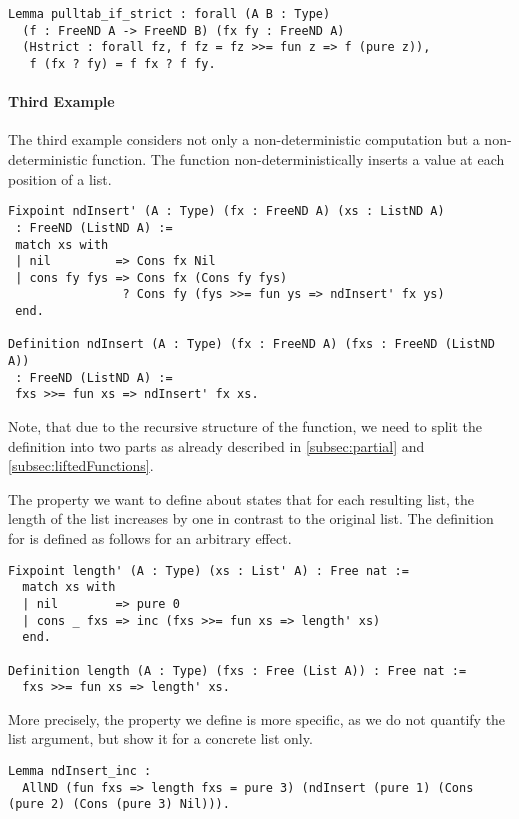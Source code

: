 \begin{verbatim}
Lemma pulltab_if_strict : forall (A B : Type)
  (f : FreeND A -> FreeND B) (fx fy : FreeND A)
  (Hstrict : forall fz, f fz = fz >>= fun z => f (pure z)),
   f (fx ? fy) = f fx ? f fy.
\end{verbatim}

\paragraph{Third Example}
The third example considers not only a non-deterministic computation but a non-deterministic function.
The function  non-deterministically inserts a value at each position of a list.

\begin{verbatim}
Fixpoint ndInsert' (A : Type) (fx : FreeND A) (xs : ListND A)
 : FreeND (ListND A) :=
 match xs with
 | nil         => Cons fx Nil
 | cons fy fys => Cons fx (Cons fy fys)
                ? Cons fy (fys >>= fun ys => ndInsert' fx ys)
 end.

Definition ndInsert (A : Type) (fx : FreeND A) (fxs : FreeND (ListND A))
 : FreeND (ListND A) :=
 fxs >>= fun xs => ndInsert' fx xs.
\end{verbatim}

Note, that due to the recursive structure of the function, we need to split the definition into two parts as already described in \autoref{subsec:partial} and \autoref{subsec:liftedFunctions}.

The property we want to define about  states that for each resulting list, the length of the list increases by one in contrast to the original list.
The definition for  is defined as follows for an arbitrary effect.

\begin{verbatim}
Fixpoint length' (A : Type) (xs : List' A) : Free nat :=
  match xs with
  | nil        => pure 0
  | cons _ fxs => inc (fxs >>= fun xs => length' xs)
  end.

Definition length (A : Type) (fxs : Free (List A)) : Free nat :=
  fxs >>= fun xs => length' xs.
\end{verbatim}
  
More precisely, the property we define is more specific, as we do not quantify the list argument, but show it for a concrete list only.

\begin{verbatim}
Lemma ndInsert_inc :
  AllND (fun fxs => length fxs = pure 3) (ndInsert (pure 1) (Cons (pure 2) (Cons (pure 3) Nil))).
\end{verbatim}

